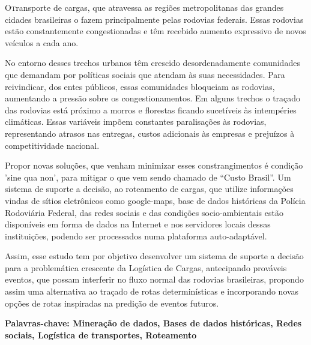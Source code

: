 \vspace*{12pt}

\lettrine {O} transporte de cargas, que atravessa as regiões metropolitanas das grandes cidades brasileiras o fazem principalmente pelas rodovias federais. 
Essas rodovias estão constantemente congestionadas e têm recebido aumento expressivo de novos veículos a cada ano. 

No entorno desses trechos urbanos têm crescido desordenadamente comunidades que demandam por políticas sociais que atendam às 
suas necessidades. Para reivindicar, dos entes públicos, essas comunidades bloqueiam as rodovias, aumentando a pressão sobre os congestionamentos.
Em alguns trechos o traçado das rodovias está próximo a morros e florestas ficando sucetíveis às intempéries climáticas.
Essas variáveis impõem constantes paralisações às rodovias, representando atrasos nas entregas, custos adicionais às empresas e prejuízos à competitividade nacional. 

Propor novas soluções, que venham minimizar esses constrangimentos é condição 'sine qua non', para mitigar o que vem sendo chamado de ``Custo Brasil''. 
Um sistema de suporte a decisão, ao roteamento de cargas, que utilize informações vindas de sítios eletrônicos como google-maps, base de dados históricas da Polícia Rodoviária 
Federal, das redes sociais e das condições socio-ambientais estão disponíveis em forma de dados na Internet e nos servidores locais dessas instituições, 
podendo ser processados numa plataforma auto-adaptável.

Assim, esse estudo tem por objetivo desenvolver um sistema de suporte a decisão para a problemática crescente da Logística de Cargas, antecipando prováveis eventos, 
que possam interferir no fluxo normal das rodovias brasileiras, propondo assim uma alternativa ao traçado de rotas determinísticas e incorporando novas opções de rotas 
inspiradas na predição de eventos futuros.

\par
\vspace{2em}
\noindent\textbf{Palavras-chave: Mineração de dados, Bases de dados históricas, Redes sociais, Logística de transportes, Roteamento}